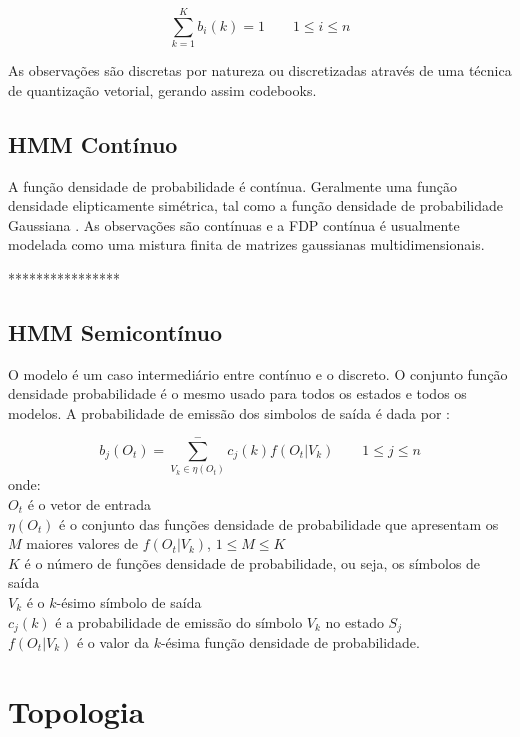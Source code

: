 $$
\displaystyle \sum_{k=1}^K b_i (k) = 1 \qquad 1 \leq i \leq n 
$$

As observações são discretas por natureza ou discretizadas através de uma técnica de quantização vetorial, gerando assim codebooks.
 


\subsection{HMM Contínuo}

\quad A função densidade de probabilidade é contínua. Geralmente uma função densidade elipticamente simétrica, tal como a função densidade de probabilidade Gaussiana \cite{fundRecFala}.
 As observações são contínuas e a FDP contínua é  usualmente modelada como uma mistura finita de matrizes gaussianas multidimensionais.

****************


\subsection{HMM Semicontínuo}

\quad O modelo é um caso intermediário entre contínuo e o discreto. O conjunto função densidade probabilidade é o mesmo usado para todos os estados e todos os modelos. A probabilidade de emissão dos simbolos de saída é dada por :


$$
\displaystyle b_j(O_t) =  \sum_{V_k \in \eta (O_t)}^-  c_j (k) f (O_t | V_k)   \qquad 1 \leq j \leq n 
$$
 onde:\\
$O_t$ é o vetor de entrada\\
$\eta(O_t)$ é o conjunto das funções densidade de probabilidade que apresentam os $M$ maiores valores de $f (O_t | V_k)$, $ 1 \leq M \leq K$\\
$K$ é o número de funções densidade de probabilidade, ou seja, os símbolos de saída\\
$V_k$ é o $k$-ésimo símbolo de saída\\
$ c_j (k)$ é a probabilidade de emissão do símbolo $V_k$ no estado $S_j$\\
$f (O_t | V_k)$ é o valor da $k$-ésima função densidade de probabilidade.



\section{Topologia}

